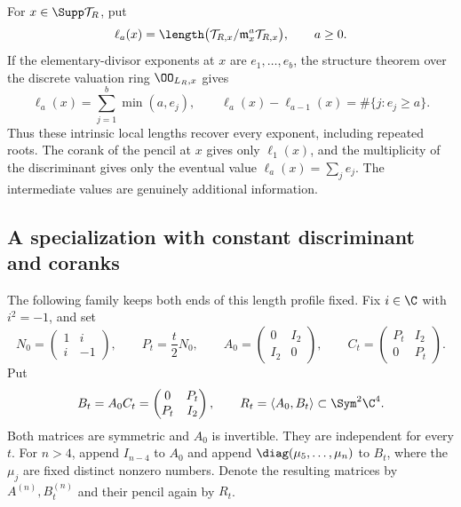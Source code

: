 For \(x\in\Supp\mathcal T_R\), put
\begin{equation}\label{eq:spectral-length-profile}
 \ell_a(x)=\length\bigl(\mathcal T_{R,x}/
                  \mathfrak m_x^a\mathcal T_{R,x}\bigr),
 \qquad a\ge0.
\end{equation}
If the elementary-divisor exponents at \(x\) are
\(e_1,\ldots,e_b\), the structure theorem over the discrete
valuation ring \(\OO_{L_R,x}\) gives
\begin{equation}\label{eq:spectral-partition-inversion}
 \ell_a(x)=\sum_{j=1}^b\min(a,e_j),\qquad
 \ell_a(x)-\ell_{a-1}(x)=\#\{j:e_j\ge a\}.
\end{equation}
Thus these intrinsic local lengths recover every exponent, including
repeated roots.  The corank of the pencil at \(x\) gives only
\(\ell_1(x)\), and the multiplicity of the discriminant gives
only the eventual value \(\ell_a(x)=\sum_j e_j\).  The
intermediate values are genuinely additional information.

\subsection{A specialization with constant discriminant and coranks}

The following family keeps both ends of this length profile fixed.
Fix \(i\in\C\) with \(i^2=-1\), and set
\begin{equation}\label{eq:rank-preserving-four-block}
 N_0=\begin{pmatrix}1&i\\i&-1\end{pmatrix},\qquad
 P_t=\frac t2N_0,\qquad
 A_0=\begin{pmatrix}0&I_2\\I_2&0\end{pmatrix},\qquad
 C_t=\begin{pmatrix}P_t&I_2\\0&P_t\end{pmatrix}.
\end{equation}
Put
\begin{equation}\label{eq:symmetric-specialization-pair}
 B_t=A_0C_t=\begin{pmatrix}0&P_t\\P_t&I_2\end{pmatrix},
 \qquad R_t=\langle A_0,B_t\rangle\subset\Sym^2\C^4.
\end{equation}
Both matrices are symmetric and \(A_0\) is invertible.  They
are independent for every \(t\).  For \(n>4\), append
\(I_{n-4}\) to \(A_0\) and append
\(\diag(\mu_5,\ldots,\mu_n)\) to \(B_t\), where the
\(\mu_j\) are fixed distinct nonzero numbers.  Denote the resulting
matrices by \(A^{(n)},B_t^{(n)}\) and their pencil again by \(R_t\).

